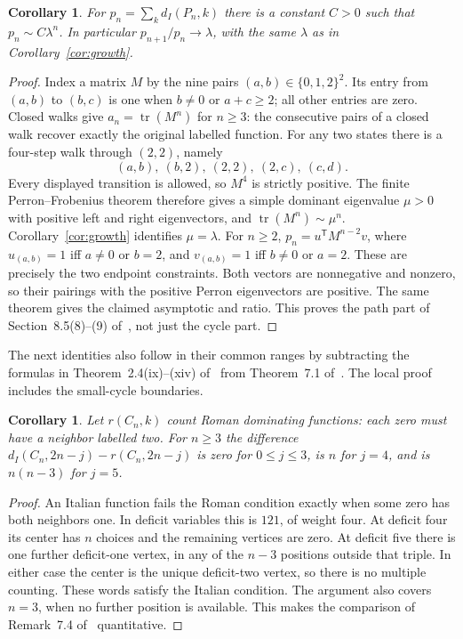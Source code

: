 \documentclass[11pt]{article}
\newtheorem{corollary}[theorem]{Corollary}
\newcommand{\di}{d_I}
\begin{document}
\begin{corollary}\label{cor:path}
For $p_n=\sum_k\di(P_n,k)$ there is a constant $C>0$ such that
$p_n\sim C\lambda^n$. In particular $p_{n+1}/p_n\to\lambda$, with the
same $\lambda$ as in Corollary~\ref{cor:growth}.
\end{corollary}
\begin{proof}
Index a matrix $M$ by the nine pairs $(a,b)\in\{0,1,2\}^2$.
Its entry from $(a,b)$ to $(b,c)$ is one when $b\ne0$ or $a+c\geq2$;
all other entries are zero. Closed walks give
$a_n=\operatorname{tr}(M^n)$ for $n\geq3$: the consecutive pairs of
a closed walk recover exactly the original labelled function.
For any two states there is a four-step walk through $(2,2)$, namely
\[
 (a,b),\ (b,2),\ (2,2),\ (2,c),\ (c,d).
\]
Every displayed transition is allowed, so $M^4$ is strictly positive.
The finite Perron--Frobenius theorem therefore gives a simple dominant
eigenvalue $\mu>0$ with positive left and right eigenvectors, and
$\operatorname{tr}(M^n)\sim\mu^n$. Corollary~\ref{cor:growth} identifies
$\mu=\lambda$.
For $n\geq2$, $p_n=u^{\mathsf T}M^{n-2}v$, where
$u_{(a,b)}=1$ iff $a\ne0$ or $b=2$, and
$v_{(a,b)}=1$ iff $b\ne0$ or $a=2$.
These are precisely the two endpoint constraints. Both vectors are
nonnegative and nonzero, so their pairings with the positive Perron
eigenvectors are positive. The same theorem gives the claimed
asymptotic and ratio. This proves the path part of Section~8.5(8)--(9)
of~\cite{SZ}, not just the cycle part.
\end{proof}

The next identities also follow in their common ranges by subtracting
the formulas in Theorem~2.4(ix)--(xiv) of~\cite{DAI} from Theorem~7.1
of~\cite{SZ}. The local proof includes the small-cycle boundaries.
\begin{corollary}\label{cor:roman}
Let $r(C_n,k)$ count Roman dominating functions: each zero must have
a neighbor labelled two. For $n\geq3$ the difference
$\di(C_n,2n-j)-r(C_n,2n-j)$ is zero for $0\leq j\leq3$, is $n$ for
$j=4$, and is $n(n-3)$ for $j=5$.
\end{corollary}
\begin{proof}
An Italian function fails the Roman condition exactly when some zero
has both neighbors one. In deficit variables this is $121$, of weight
four. At deficit four its center has $n$ choices and the remaining
vertices are zero. At deficit five there is one further deficit-one
vertex, in any of the $n-3$ positions outside that triple. In either case
the center is the unique deficit-two vertex, so there is no multiple
counting. These words satisfy the Italian condition. The argument
also covers $n=3$, when no further position is available. This makes
the comparison of Remark~7.4 of~\cite{SZ} quantitative.
\end{proof}
\end{document}
